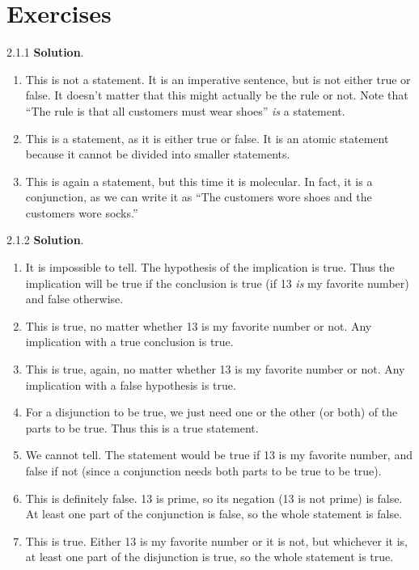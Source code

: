\documentclass[11pt,]{book}
\theoremstyle{ptxplainnotitle}
\theoremstyle{ptxplaintitle}
\theoremstyle{ptxdefinitionnotitle}
\theoremstyle{ptxdefinitiontitle}
\theoremstyle{ptxdefinitionnotitle}
\theoremstyle{ptxdefinitiontitle}
\theoremstyle{ptxdefinitionnotitle}
\theoremstyle{ptxdefinitiontitle}
\theoremstyle{ptxdefinitiontitlenonumber}
\theoremstyle{ptxdefinitiontitlenonumber}
\numberwithin{equation}{chapter}
\begin{document}
\section*{Exercises}
\begin{divisionexercise}{2.1.1}
\textbf{Solution}.\quad%
\hypertarget{p-1910}{}%
\leavevmode%
\begin{enumerate}[label=\alph*.]
\item\hypertarget{li-826}{}\hypertarget{p-1911}{}%
This is not a statement.  It is an imperative sentence, but is not either true or false.  It doesn't matter that this might actually be the rule or not.  Note that ``The rule is that all customers must wear shoes'' \emph{is} a statement.%
\item\hypertarget{li-827}{}\hypertarget{p-1912}{}%
This is a statement, as it is either true or false.  It is an atomic statement because it cannot be divided into smaller statements.%
\item\hypertarget{li-828}{}\hypertarget{p-1913}{}%
This is again a statement, but this time it is molecular.  In fact, it is a conjunction, as we can write it as ``The customers wore shoes and the customers wore socks.''%
\end{enumerate}
%
\end{divisionexercise}%
\begin{divisionexercise}{2.1.2}
\textbf{Solution}.\quad%
\hypertarget{p-1966}{}%
\leavevmode%
\begin{enumerate}[label=\alph*.]
\item\hypertarget{li-878}{}\hypertarget{p-1967}{}%
It is impossible to tell.  The hypothesis of the implication is true.  Thus the implication will be true if the conclusion is true (if 13 \emph{is} my favorite number) and false otherwise.%
\item\hypertarget{li-879}{}\hypertarget{p-1968}{}%
This is true, no matter whether 13 is my favorite number or not.  Any implication with a true conclusion is true.%
\item\hypertarget{li-880}{}\hypertarget{p-1969}{}%
This is true, again, no matter whether 13 is my favorite number or not.  Any implication with a false hypothesis is true.%
\item\hypertarget{li-881}{}\hypertarget{p-1970}{}%
For a disjunction to be true, we just need one or the other (or both) of the parts to be true.  Thus this is a true statement.%
\item\hypertarget{li-882}{}\hypertarget{p-1971}{}%
We cannot tell.  The statement would be true if 13 is my favorite number, and false if not (since a conjunction needs both parts to be true to be true).%
\item\hypertarget{li-883}{}\hypertarget{p-1972}{}%
This is definitely false.  13 is prime, so its negation (13 is not prime) is false.  At least one part of the conjunction is false, so the whole statement is false.%
\item\hypertarget{li-884}{}\hypertarget{p-1973}{}%
This is true.  Either 13 is my favorite number or it is not, but whichever it is, at least one part of the disjunction is true, so the whole statement is true.%
\end{enumerate}
%
\end{divisionexercise}%
\end{document}
